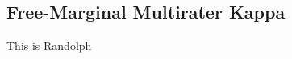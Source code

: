 \subsection{Free-Marginal Multirater Kappa}
\label{chp:fundamentals:sec:inter_rater_agreement:subsec:free_marginal_multirater_kappa}
This is Randolph
